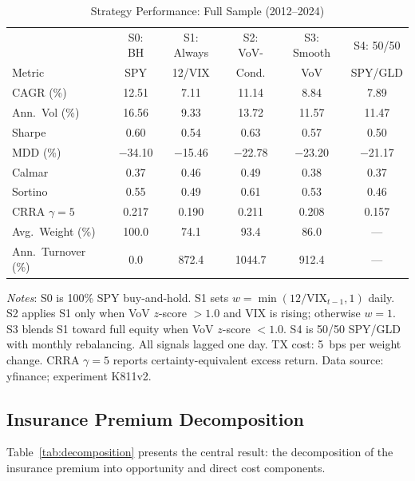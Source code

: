 \documentclass[12pt,a4paper]{article}
\begin{document}
\begin{table}[H]
\centering
\begin{threeparttable}
\caption{Strategy Performance: Full Sample (2012--2024)}
\label{tab:performance}
\begin{tabular}{lccccc}
\toprule
 & S0: BH & S1: Always & S2: VoV- & S3: Smooth & S4: 50/50 \\
Metric & SPY & 12/VIX & Cond. & VoV & SPY/GLD \\
\midrule
CAGR (\%) & 12.51 & 7.11 & 11.14 & 8.84 & 7.89 \\
Ann.\ Vol (\%) & 16.56 & 9.33 & 13.72 & 11.57 & 11.47 \\
Sharpe & 0.60 & 0.54 & 0.63 & 0.57 & 0.50 \\
MDD (\%) & $-$34.10 & $-$15.46 & $-$22.78 & $-$23.20 & $-$21.17 \\
Calmar & 0.37 & 0.46 & 0.49 & 0.38 & 0.37 \\
Sortino & 0.55 & 0.49 & 0.61 & 0.53 & 0.46 \\
CRRA $\gamma\!=\!5$ & 0.217 & 0.190 & 0.211 & 0.208 & 0.157 \\
\midrule
Avg.\ Weight (\%) & 100.0 & 74.1 & 93.4 & 86.0 & --- \\
Ann.\ Turnover (\%) & 0.0 & 872.4 & 1044.7 & 912.4 & --- \\
\bottomrule
\end{tabular}
\begin{tablenotes}
\small
\item \textit{Notes}: S0 is 100\% SPY buy-and-hold. S1 sets $w = \min(12/\text{VIX}_{t-1}, 1)$ daily. S2 applies S1 only when VoV $z$-score $> 1.0$ and VIX is rising; otherwise $w = 1$. S3 blends S1 toward full equity when VoV $z$-score $< 1.0$. S4 is 50/50 SPY/GLD with monthly rebalancing. All signals lagged one day. TX cost: 5~bps per weight change. CRRA $\gamma\!=\!5$ reports certainty-equivalent excess return. Data source: yfinance; experiment K811v2.
\end{tablenotes}
\end{threeparttable}
\end{table}

\subsection{Insurance Premium Decomposition}

Table~\ref{tab:decomposition} presents the central result: the decomposition of the insurance premium into opportunity and direct cost components.
\end{document}
